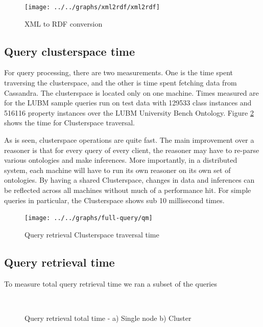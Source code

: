 \documentclass[journal]{IEEEtran}
\begin{document}
\begin{figure}[h]
    \centering
    \texttt{[image: ../../graphs/xml2rdf/xml2rdf]}
    \caption{XML to RDF conversion}
    \label{fig:eval:xml2rdf}
\end{figure}

\subsection{Query clusterspace time}

For query processing, there are two measurements. One is the time spent traversing the clusterspace, and the other is time spent fetching data from Cassandra. The clusterspace is located only on one machine. Times measured are for the LUBM sample queries run on test data with 129533 class instances and 516116 property instances over the LUBM University Bench Ontology. Figure \ref{fig:eval:qcs} shows the time for Clusterspace traversal.

As is seen, clusterspace operations are quite fast. The main improvement over a reasoner is that for every query of every client, the reasoner may have to re-parse various ontologies and make inferences. More importantly, in a distributed system, each machine will have to run its own reasoner on its own set of ontologies. By having a shared Clusterspace, changes in data and inferences can be reflected across all machines without much of a performance hit. For simple queries in particular, the Clusterspace shows sub 10 millisecond times.

\begin{figure}[h]
    \centering
    \texttt{[image: ../../graphs/full-query/qm]}
    \caption{Query retrieval Clusterspace traversal time}
    \label{fig:eval:qcs}
\end{figure}

\subsection{Query retrieval time}

To measure total query retrieval time we ran a subset of the queries

\begin{figure}[t]
    \centering
    \mbox{
        \quad
    }
    \caption{Query retrieval total time - a) Single node b) Cluster }
    \label{fig:eval:qtotal}
\end{figure}
\end{document}
